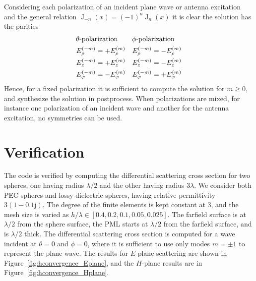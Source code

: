 \documentclass[a4paper,12pt]{article}
\newcommand{\mrm}[1]{\mathrm{#1}}
\newcommand{\ju}{\mrm{j}}
\newcommand{\BesselJ}{\operatorname{J}}
\begin{document}
Considering each polarization of an incident plane wave or antenna
excitation and the general relation
$\BesselJ_{-n}(x) = (-1)^{n}\BesselJ_{n}(x)$ it is clear the solution
has the parities
\begin{align}
  &\hspace{-1cm}\text{$\theta$-polarization} && \hspace{-1cm}\text{$\phi$-polarization} \notag \\
  E_{\rho}^{(-m)} &= +E_{\rho}^{(m)} & E_{\rho}^{(-m)} &= -E_{\rho}^{(m)} \\
  E_{z}^{(-m)} &= +E_{z}^{(m)} & E_{z}^{(-m)} &= -E_{z}^{(m)} \\
  E_{\varphi}^{(-m)} &= -E_{\varphi}^{(m)} & E_{\varphi}^{(-m)} &= +E_{\varphi}^{(m)} 
\end{align}
Hence, for a fixed polarization it is sufficient to compute the
solution for $m\geq0$, and synthesize the solution in
postprocess. When polarizations are mixed, for instance one
polarization of an incident wave and another for the antenna
excitation, no symmetries can be used.



\section{Verification}
\label{sec:verification}

The code is verified by computing the differential scattering cross
section for two spheres, one having radius $\lambda/2$ and the other
having radius $3\lambda$. We consider both PEC spheres and lossy
dielectric spheres, having relative permittivity $3(1-0.1\ju)$. The
degree of the finite elements is kept constant at 3, and the mesh size
is varied as $h/\lambda \in [0.4, 0.2, 0.1, 0.05, 0.025]$. The
farfield surface is at $\lambda/2$ from the sphere surface, the PML
starts at $\lambda/2$ from the farfield surface, and is $\lambda/2$
thick. The differential scattering cross section is computed for a
wave incident at $\theta=0$ and $\phi=0$, where it is sufficient to
use only modes $m=\pm1$ to represent the plane wave. The results for
$E$-plane scattering are shown in
Figure~\ref{fig:hconvergence_Eplane}, and the $H$-plane results are in
Figure~\ref{fig:hconvergence_Hplane}.
\end{document}
